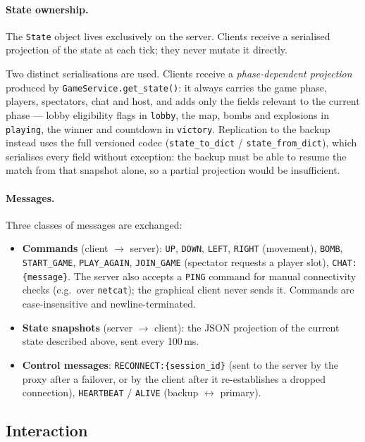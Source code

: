 \documentclass{scrartcl}
\begin{document}
\paragraph{State ownership.}
The \texttt{State} object lives exclusively on the server.
Clients receive a serialised projection of the state at each tick; they never mutate it directly.

Two distinct serialisations are used. Clients receive a \emph{phase-dependent
projection} produced by \texttt{GameService.get\_state()}: it always carries the
game phase, players, spectators, chat and host, and adds only the fields relevant
to the current phase --- lobby eligibility flags in \texttt{lobby}, the map, bombs
and explosions in \texttt{playing}, the winner and countdown in \texttt{victory}.
Replication to the backup instead uses the full versioned codec
(\texttt{state\_to\_dict} / \texttt{state\_from\_dict}), which serialises every
field without exception: the backup must be able to resume the match from that
snapshot alone, so a partial projection would be insufficient.

\paragraph{Messages.}
Three classes of messages are exchanged:
\begin{itemize}
    \item \textbf{Commands} (client $\to$ server): \texttt{UP}, \texttt{DOWN},
    \texttt{LEFT}, \texttt{RIGHT} (movement), \texttt{BOMB},
    \texttt{START\_GAME}, \texttt{PLAY\_AGAIN}, \texttt{JOIN\_GAME} (spectator
    requests a player slot), \texttt{CHAT:\{message\}}. The server also accepts
    a \texttt{PING} command for manual connectivity checks (e.g.\ over
    \texttt{netcat}); the graphical client never sends it.
    Commands are case-insensitive and newline-terminated.
    \item \textbf{State snapshots} (server $\to$ client): the JSON projection of
    the current state described above, sent every 100\,ms.    \item \textbf{Control messages}: \texttt{RECONNECT:\{session\_id\}} (sent to the server by the proxy after a failover, or by the client after it re-establishes a dropped connection), \texttt{HEARTBEAT} / \texttt{ALIVE} (backup $\leftrightarrow$ primary).
\end{itemize}

\subsection{Interaction}\label{interaction}
\end{document}
